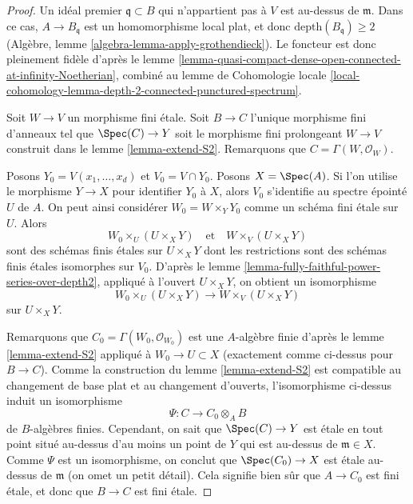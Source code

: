\begin{proof}
Un idéal premier $\mathfrak q \subset B$ qui n'appartient pas à $V$
est au-dessus de $\mathfrak m$. Dans ce cas, $A \to B_\mathfrak q$
est un homomorphisme local plat, et donc $\text{depth}(B_\mathfrak q) \geq 2$
(Algèbre, lemme \ref{algebra-lemma-apply-grothendieck}).
Le foncteur est donc pleinement fidèle d'après le
lemme \ref{lemma-quasi-compact-dense-open-connected-at-infinity-Noetherian},
combiné au lemme de Cohomologie locale
\ref{local-cohomology-lemma-depth-2-connected-punctured-spectrum}.

\medskip\noindent
Soit $W \to V$ un morphisme fini étale. Soit $B \to C$ l'unique morphisme fini
d'anneaux tel que $\Spec(C) \to Y$ soit le morphisme fini prolongeant
$W \to V$ construit dans le lemme \ref{lemma-extend-S2}.
Remarquons que $C = \Gamma(W, \mathcal{O}_W)$.

\medskip\noindent
Posons $Y_0 = V(x_1, \ldots, x_d)$ et $V_0 = V \cap Y_0$. Posons $X = \Spec(A)$.
Si l'on utilise le morphisme $Y \to X$ pour identifier $Y_0$ à $X$,
alors $V_0$ s'identifie au spectre épointé $U$ de $A$.
On peut ainsi considérer $W_0 = W \times_Y Y_0$ comme un schéma fini étale
sur $U$. Alors
$$
W_0 \times_U (U \times_X Y)
\quad\text{et}\quad
W \times_V (U \times_X Y)
$$
sont des schémas finis étales sur $U \times_X Y$ dont les restrictions sont
des schémas finis étales isomorphes sur $V_0$. D'après le
lemme \ref{lemma-fully-faithful-power-series-over-depth2},
appliqué à l'ouvert $U \times_X Y$, on obtient un isomorphisme
$$
W_0 \times_U (U \times_X Y) \longrightarrow W \times_V (U \times_X Y)
$$
sur $U \times_X Y$.

\medskip\noindent
Remarquons que $C_0 = \Gamma(W_0, \mathcal{O}_{W_0})$ est une $A$-algèbre finie
d'après le lemme \ref{lemma-extend-S2} appliqué à $W_0 \to U \subset X$ (exactement
comme ci-dessus pour $B \to C$). Comme la construction du
lemme \ref{lemma-extend-S2} est compatible au changement de base plat
et au changement d'ouverts, l'isomorphisme ci-dessus induit
un isomorphisme
$$
\Psi : C \longrightarrow C_0 \otimes_A B
$$
de $B$-algèbres finies. Cependant, on sait que $\Spec(C) \to Y$
est étale en tout point situé au-dessus d'au moins un point de $Y$ qui est
au-dessus de $\mathfrak m \in X$. Comme $\Psi$ est un isomorphisme, on
conclut que $\Spec(C_0) \to X$
est étale au-dessus de $\mathfrak m$ (on omet un petit détail).
Cela signifie bien sûr que $A \to C_0$ est fini
étale, et donc que $B \to C$ est fini étale.
\end{proof}

